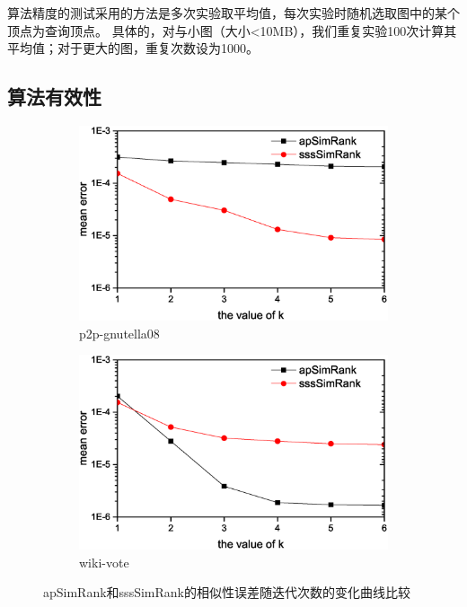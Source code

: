\documentclass[master]{njuthesis}
\begin{document}
算法精度的测试采用的方法是多次实验取平均值，每次实验时随机选取图中的某个顶点为查询顶点。
具体的，对与小图（大小<10MB），我们重复实验100次计算其平均值；对于更大的图，重复次数设为1000。
\subsection{算法有效性}
\begin{figure}[h]
\centering
\begin{subfigure}[b]{0.48\textwidth}
	\center
	\includegraphics[width=1\textwidth]{figure/accuracy1.eps}
	\caption{p2p-gnutella08}
	\label{fig:ch1:effec:one}
\end{subfigure}
\begin{subfigure}[b]{0.48\textwidth}
	\centering
	\includegraphics[width=1\textwidth]{figure/accuracy2.eps}
	\caption{wiki-vote}
	\label{fig:ch1:effec:two}
\end{subfigure}
\label{fig:ch1:effec}
\caption{apSimRank和sssSimRank的相似性误差随迭代次数的变化曲线比较}
\end{figure}
\end{document}
